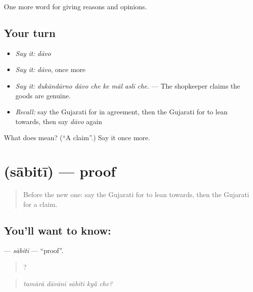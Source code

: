 \begin{grammarlens}[title={What you've built}]
One more word for giving reasons and opinions.
\end{grammarlens}

\subsection*{Your turn}
\begin{itemize}
\raggedright
  \item \emph{Say it:} \emph{dāvo}
  \item \emph{Say it:} \emph{dāvo}, once more
  \item \emph{Say it:} \emph{dukāndārno dāvo che ke māl aslī che.} — The shopkeeper claims the goods are genuine.
  \item \emph{Recall:} say the Gujarati for in agreement, then the Gujarati for to lean towards, then say \emph{dāvo} again
\end{itemize}

\begin{tcolorbox}[breakable,colback=teal!4,colframe=teal!35!black,title={Before you move on}]
What does  mean? (\textquotedblleft{}A claim\textquotedblright{}.) Say it once more.
\end{tcolorbox}
\section[\texorpdfstring{\gu{સાબિતી} (sābitī)}{સાબિતી (sābitī)}]{ (sābitī) — proof}

\label{lesson:GU-C344-sabiti}



\begin{quote}
Before the new one: say the Gujarati for to lean towards, then the Gujarati for a claim.
\end{quote}

\subsection*{You'll want to know: }
\textbf{} — \emph{sābitī} — \textquotedblleft{}proof\textquotedblright{}.

\begin{quote}
    ?
\end{quote}

\begin{quote}
\emph{tamārā dāvānī sābitī kyā̃ che?}
\end{quote}

